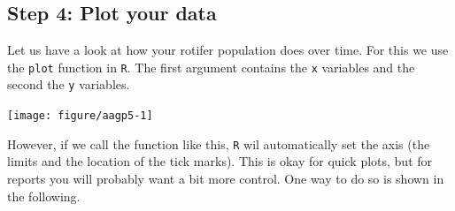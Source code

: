 \documentclass{article}\usepackage[]{graphicx}\usepackage[]{color}
\newenvironment{knitrout}{}{} %
\begin{document}
\subsection{Step 4: Plot your data}
Let us have a look at how your rotifer population does over time. For this we use the \texttt{plot} function in \texttt{R}. The first argument contains the \texttt{x} variables and the second the \texttt{y} variables.
\begin{knitrout}
\color{fgcolor}

{\centering \texttt{[image: figure/aagp5-1]} 

}



\end{knitrout}
However, if we call the function like this, \texttt{R} wil automatically set the axis (the limits and the location of the tick marks). This is okay for quick plots, but for reports you will probably want a bit more control. One way to do so is shown in the following.
\end{document}
